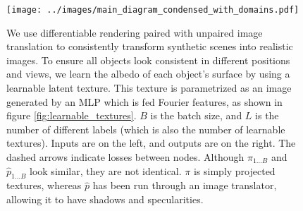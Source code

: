 \documentclass{article}
\begin{document}
\begin{figure}[H]
	\begin{center}
		\texttt{[image: ../images/main\_diagram\_condensed\_with\_domains.pdf]}
	\end{center}
	\caption{
		We use differentiable rendering paired with unpaired image translation to consistently transform synthetic scenes into realistic images.
		To ensure all objects look consistent in different positions and views, we learn the albedo of each object's surface by using a learnable latent texture.
		This texture is parametrized as an image generated by an MLP which is fed Fourier features, as shown in figure \ref{fig:learnable_textures}.
		$B$ is the batch size, and $L$ is the number of different labels (which is also the number of learnable textures).
		Inputs are on the left, and outputs are on the right.
		The dashed arrows indicate losses between nodes.
		Although $\pi_{1\dots B}$ and $\hat{p}_{1\dots B}$ look similar, they are not identical. 
		$\pi$ is simply projected textures, whereas $\hat{p}$ has been run through an image translator, allowing it to have shadows and specularities.
	}
	\label{fig:main_diagram}
\end{figure}
\end{document}
